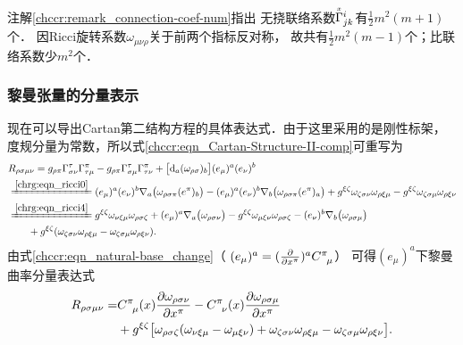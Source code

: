 \begin{remark}\label{chrg:remark_ricci-coef-num}
    注解\ref{chccr:remark_connection-coef-num}指出
    无挠联络系数$\oversetmy{x}{\Gamma}^{i}_{jk}$有$\frac{1}{2}m^2(m+1)$个．
    因Ricci旋转系数$\omega_{\mu\nu\rho}$关于前两个指标反对称，
    故共有$\frac{1}{2}m^2(m-1)$个；比联络系数少$m^2$个．
\end{remark}


\subsubsection{黎曼张量的分量表示}\label{chrg:sec_Riemann_rr}
现在可以导出Cartan第二结构方程的具体表达式．由于这里采用的是{\kaishu 刚性}标架，
度规分量为常数，所以式\eqref{chccr:eqn_Cartan-Structure-II-comp}可重写为
\setlength{\mathindent}{0em}
\begin{align*}
    &R_{\rho\sigma\mu\nu} = g_{\rho\pi} \Gamma _{\sigma \nu}^\tau \Gamma _{\tau\mu}^\pi
      - g_{\rho\pi}\Gamma _{\sigma \mu}^\tau \Gamma_{\tau\nu}^\pi +
      \bigl[{\rm d}_a (\omega_{\rho \sigma} )_b \bigr] (e_\mu)^a (e_\nu)^b     \\
     &\xlongequal{\ref{chrg:eqn_ricci0}} 
      (e_\mu)^a (e_\nu)^b \nabla_a\bigl(\omega_{\rho\sigma\pi} (e^\pi)_{b}\bigr) -
      (e_\mu)^a (e_\nu)^b \nabla_b \bigl(\omega_{\rho\sigma\pi} (e^\pi)_{a}  \bigr)
      + g^{\xi\zeta} \omega _{\zeta\sigma\nu} \omega _{\rho\xi\mu}
      -g^{\xi\zeta} \omega _{\zeta\sigma\mu} \omega _{\rho\xi\nu}  \\
     &\xlongequal{\ref{chrg:eqn_ricci4}} 
       g^{\xi\zeta}\omega_{\nu\xi\mu}\omega_{\rho\sigma\zeta}
      +(e_\mu)^a \nabla_a\bigl(\omega_{\rho\sigma\nu} \bigr)
      - g^{\xi\zeta}\omega_{\mu\xi\nu}\omega_{\rho\sigma\zeta}
      -(e_\nu)^b \nabla_b \bigl(\omega_{\rho\sigma\mu} \bigr)   \\
    &{\qquad} + g^{\xi\zeta} (\omega _{\zeta\sigma\nu} \omega _{\rho\xi\mu}
      - \omega _{\zeta\sigma\mu} \omega _{\rho\xi\nu}) .
\end{align*}\setlength{\mathindent}{2em}
由式\eqref{chccr:eqn_natural-base_change}（
$({e}_\mu)^a = (\frac{\partial}{\partial x^\pi})^a C_{\hphantom{\pi} \mu}^{\pi}$）
可得$(e_\mu)^a$下黎曼曲率分量表达式
\begin{equation}\label{chrg:eqn_Riemann_rr}
\begin{aligned}
   R_{\rho\sigma\mu\nu} =&
    C_{\hphantom{\pi} \mu}^{\pi}(x) \frac{\partial \omega_{\rho\sigma\nu}}{\partial x^\pi}
   -C_{\hphantom{\pi} \nu}^{\pi}(x) \frac{\partial \omega_{\rho\sigma\mu}}{\partial x^\pi} \\
   & + g^{\xi\zeta} \bigl[ \omega_{\rho\sigma\zeta} (\omega_{\nu\xi\mu}
   -\omega_{\mu\xi\nu}  ) + \omega _{\zeta\sigma\nu} \omega _{\rho\xi\mu}
   - \omega _{\zeta\sigma\mu} \omega _{\rho\xi\nu} \bigr] .
\end{aligned}
\end{equation}


